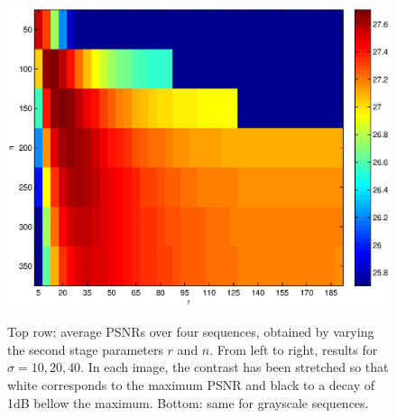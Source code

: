 \documentclass[10pt, journal, twocolumn, final, a4paper]{IEEEtran}
\begin{document}
\begin{figure}[htpb!]
\begin{center}
		\includegraphics[width=.25\textwidth]{figs/params_tables/fpsnr_r2-np2-image_s40_average_mono.eps}\\
	\end{center}
	\caption{Top row: average PSNRs over four sequences, obtained by varying the
		second stage parameters $r$ and $n$. From left to right, results for
		$\sigma = 10, 20, 40$. In each image, the contrast has been stretched so
		that white corresponds to the maximum PSNR and black to a decay of 1dB
		bellow the maximum. 
		Bottom: same for grayscale sequences.} 
	\label{fig:rank-nsim-image-stage2}
\end{figure}
\end{document}
